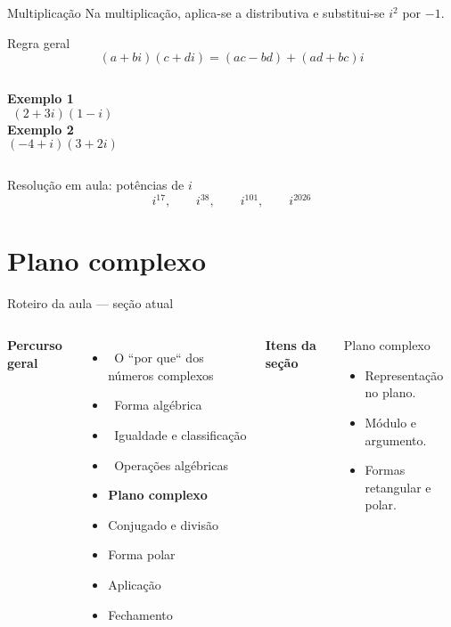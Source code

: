 \documentclass[aspectratio=169]{beamer}
\newcommand{\EspacoEscrita}[1]{%
  \vspace{0.25em}
  \begin{minipage}[t][#1][t]{\linewidth}
  \end{minipage}
}
\newcommand{\secaoPassada}[1]{{\color{ThemeSecondary}\checkmark\ #1}}
\newcommand{\secaoAtual}[1]{{\color{ThemeAccent}\textbf{\large #1}}}
\newcommand{\secaoFutura}[1]{{\color{ThemeDark!55}#1}}
\newcommand{\MapaSecao}[3]{%
\begin{frame}{Roteiro da aula — seção atual}
\vspace{-0.55em}
\begin{columns}[T,onlytextwidth]
\column{0.54\textwidth}
\footnotesize
\textbf{Percurso geral}\par\vspace{0.25em}
#1
\column{0.03\textwidth}
\column{0.35\textwidth}
\footnotesize
\textbf{Itens da seção}\par\vspace{0.25cm}
\begin{block}{#2}
#3
\end{block}
\column{0.03\textwidth}
\end{columns}
\end{frame}
}
\begin{document}
\begin{frame}{Multiplicação}
\vspace{-0.45em}
\small
Na multiplicação, aplica-se a distributiva e substitui-se $i^2$ por $-1$.

\begin{block}{Regra geral}
\[
  (a+bi)(c+di)=(ac-bd)+(ad+bc)i
\]
\end{block}
\begin{columns}[T,onlytextwidth]
\textbf{Exemplo 1}
\[(2+3i)(1-i)\]
\textbf{Exemplo 2}
\[(-4+i)(3+2i)\]
\end{columns}
\EspacoEscrita{0.25\textheight}
\end{frame}

\begin{frame}{Resolução em aula: potências de $i$}
\vspace{-0.8em}
\small
\[
  i^{17}, \qquad i^{38}, \qquad i^{101}, \qquad i^{2026}
\]
\EspacoEscrita{0.50\textheight}
\end{frame}

\section{Plano complexo}

\MapaSecao{
\begin{itemize}
  \item \secaoPassada{O ``por que`` dos números complexos}
  \item \secaoPassada{Forma algébrica}
  \item \secaoPassada{Igualdade e classificação}
  \item \secaoPassada{Operações algébricas}
  \item \secaoAtual{Plano complexo}
  \item \secaoFutura{Conjugado e divisão}
  \item \secaoFutura{Forma polar}
  \item \secaoFutura{Aplicação}
  \item \secaoFutura{Fechamento}
\end{itemize}
}{Plano complexo}{
\begin{itemize}
  \item Representação no plano.
  \item Módulo e argumento.
  \item Formas retangular e polar.
\end{itemize}
}
\end{document}
